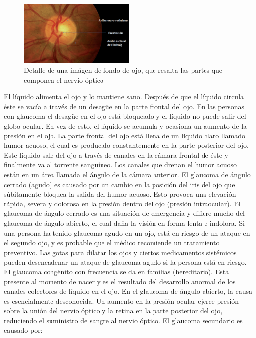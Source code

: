 \begin{description}
\begin{figure}[H]
	{
	\centering
	\includegraphics[width=0.5\textwidth]{Figures/nervioOptico}
	\caption[Glaucoma]{Detalle de una im\'agen de fondo de ojo, que resalta las partes que componen el nervio \'optico}
	\label{fig:Glaucoma}
	}
\end{figure}
El l\'iquido alimenta el ojo y lo mantiene sano. Despu\'es de que el l\'iquido circula \'este se vac\'ia a trav\'es de un desagüe en la parte frontal del ojo. En las personas con glaucoma el desagüe en el ojo est\'a bloqueado y el l\'iquido no puede salir del globo ocular. En vez de esto, el l\'iquido se acumula y ocasiona un aumento de la presi\'on en el ojo. 
La parte frontal del ojo est\'a llena de un l\'iquido claro llamado humor acuoso, el cual es producido constantemente en la parte posterior del ojo. Este l\'iquido sale del ojo a trav\'es de canales en la c\'amara frontal de \'este y finalmente va al torrente sangu\'ineo. Los canales que drenan el humor acuoso est\'an en un \'area llamada el \'angulo de la c\'amara anterior. El glaucoma de \'angulo cerrado (agudo) es causado por un cambio en la posici\'on del iris del ojo que s\'ubitamente bloquea la salida del humor acuoso. Esto provoca una elevaci\'on r\'apida, severa y dolorosa en la presi\'on dentro del ojo (presi\'on intraocular). El glaucoma de \'angulo cerrado es una situaci\'on de emergencia y difiere mucho del glaucoma de \'angulo abierto, el cual daña la visi\'on en forma lenta e indolora. Si una persona ha tenido glaucoma agudo en un ojo, est\'a en riesgo de un ataque en el segundo ojo, y es probable que el m\'edico recomiende un tratamiento preventivo. Las gotas para dilatar los ojos y ciertos medicamentos sist\'emicos pueden desencadenar un ataque de glaucoma agudo si la persona est\'a en riesgo. El glaucoma cong\'enito con frecuencia se da en familias (hereditario). Est\'a presente al momento de nacer y es el resultado del desarrollo anormal de los canales colectores de l\'iquido en el ojo. En el glaucoma de \'angulo abierto, la causa es esencialmente desconocida. Un aumento en la presi\'on ocular ejerce presi\'on sobre la uni\'on del nervio \'optico y la retina en la parte posterior del ojo, reduciendo el suministro de sangre al nervio \'optico. El glaucoma secundario es causado por: 

\end{description}
